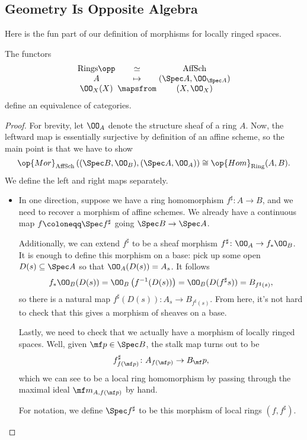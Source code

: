 \documentclass[../notes.tex]{subfiles}
\begin{document}
\subsection{Geometry Is Opposite Algebra}
Here is the fun part of our definition of morphisms for locally ringed spaces.
\begin{proposition} \label{prop:geoisoppalg}
	The functors
	\[\arraycolsep=1.4pt\begin{array}{ccc}
		\mathrm{Rings}\opp &\simeq& \mathrm{AffSch} \\
		A &\mapsto& (\Spec A,\OO_{\Spec A}) \\
		\OO_X(X) &\mapsfrom& (X,\OO_X)
	\end{array}\]
	define an equivalence of categories.
\end{proposition}
\begin{proof}
	For brevity, let $\OO_A$ denote the structure sheaf of a ring $A$. Now, the leftward map is essentially surjective by definition of an affine scheme, so the main point is that we have to show
	\[\op{Mor}_{\mathrm{AffSch}}\left((\Spec B,\OO_B),(\Spec A,\OO_A)\right)\cong\op{Hom}_{\mathrm{Ring}}(A,B).\]
	We define the left and right maps separately.
	\begin{itemize}
		\item In one direction, suppose we have a ring homomorphism $f^\sharp\colon A\to B$, and we need to recover a morphism of affine schemes. We already have a continuous map $f\coloneqq\Spec f^\sharp$ going $\Spec B\to\Spec A$.
	
		Additionally, we can extend $f^\sharp$ to be a sheaf morphism $f^\sharp\colon\OO_A\to f_*\OO_B$. It is enough to define this morphism on a base: pick up some open $D(s)\subseteq\Spec A$ so that $\OO_A(D(s))=A_s$. It follows
		\[f_*\OO_B(D(s))=\OO_B\left(f^{-1}(D(s))\right)=\OO_B(D(f^\sharp s))=B_{f^\sharp(s)},\]
		so there is a natural map $f^\sharp(D(s))\colon A_s\to B_{f^\sharp(s)}$. From here, it's not hard to check that this gives a morphism of sheaves on a base.

		Lastly, we need to check that we actually have a morphism of locally ringed spaces. Well, given $\mf p\in\Spec B$, the stalk map turns out to be
		\[f^\sharp_{f(\mf p)}\colon A_{f(\mf p)}\to B_\mf p,\]
		which we can see to be a local ring homomorphism by passing through the maximal ideal $\mf m_{A,f(\mf p)}$ by hand.

		For notation, we define $\Spec f^\sharp$ to be this morphism of local rings $(f,f^\sharp)$.


\end{itemize}
\end{proof}
\end{document}
